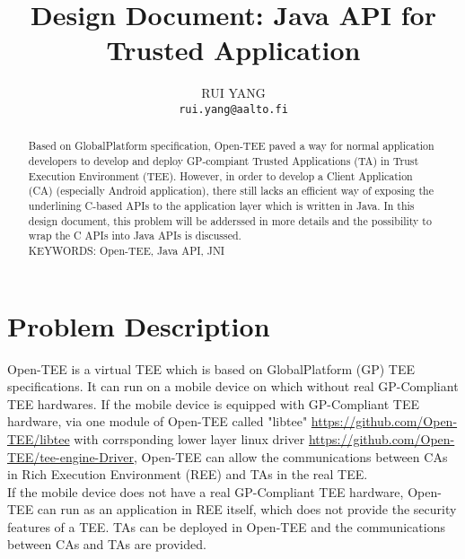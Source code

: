 \documentclass{cseminar}
\begin{document}

\title{Design Document: Java API for Trusted Application}

\author{RUI YANG \\
	\texttt{rui.yang@aalto.fi}}
\maketitle


\begin{abstract}
Based on GlobalPlatform specification, Open-TEE paved a way for normal application developers to develop and deploy GP-compiant Trusted Applications (TA) in Trust Execution Environment (TEE). However, in order to develop a Client Application (CA) (especially Android application), there still lacks an efficient way of exposing the underlining C-based APIs to the application layer which is written in Java. In this design document, this problem will be adderssed in more details and the possibility to wrap the C APIs into Java APIs is discussed.
\vspace{3mm}\\
\noindent KEYWORDS: Open-TEE, Java API, JNI
\end{abstract}

\section{Problem Description}
Open-TEE is a virtual TEE which is based on GlobalPlatform (GP) TEE specifications. It can run on a mobile device on which without real GP-Compliant TEE hardwares. If the mobile device is equipped with GP-Compliant TEE hardware, via one module of Open-TEE called "libtee" \url{https://github.com/Open-TEE/libtee} with corrsponding lower layer linux driver \url{https://github.com/Open-TEE/tee-engine-Driver}, Open-TEE can allow the communications between CAs in Rich Execution Environment (REE) and TAs in the real TEE.\\

If the mobile device does not have a real GP-Compliant TEE hardware, Open-TEE can run as an application in REE itself, which does not provide the security features of a TEE. TAs can be deployed in Open-TEE and the communications between CAs and TAs are provided.\\
\end{document}
